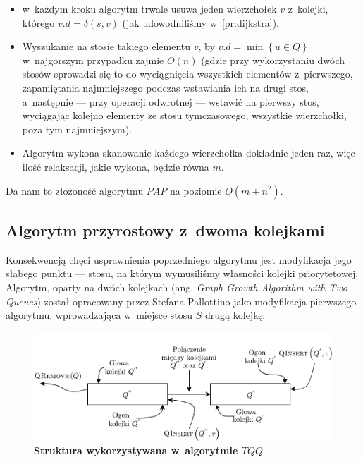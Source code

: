 \begin{itemize}
\item w~każdym kroku algorytm trwale usuwa jeden wierzchołek $v$ z~kolejki, którego $v.d = \delta \left( s, v \right)$ (jak udowodniliśmy w~\ref{pr:dijkstra}).
\item Wyszukanie na stosie takiego elementu $v$, by $v.d = \min \left\{ u \in Q \right\}$ w~najgorszym przypadku zajmie $ O \left( n \right) $ (gdzie przy wykorzystaniu dwóch stosów sprowadzi się to do wyciągnięcia wszystkich elementów z~pierwszego, zapamiętania najmniejszego podczas wstawiania ich na drugi stos, a~następnie --- przy operacji odwrotnej --- wstawić na pierwszy stos, wyciągając kolejno elementy ze stosu tymczasowego, wszystkie wierzchołki, poza tym najmniejszym).
\item Algorytm wykona skanowanie każdego wierzchołka dokładnie jeden raz, więc ilość relaksacji, jakie wykona, będzie równa $m$.
\end{itemize}

Da nam to złożoność algorytmu $PAP$ na poziomie $ O \left( m + n^{2} \right)$.

\subsection{Algorytm przyrostowy z~dwoma kolejkami}

Konsekwencją chęci usprawnienia poprzedniego algorytmu jest modyfikacja jego słabego punktu --- stosu, na którym wymusiliśmy własności kolejki priorytetowej. Algorytm, oparty na dwóch kolejkach (ang. \textit{Graph Growth Algorithm with Two Queues}) został opracowany przez Stefana Pallottino jako modyfikacja pierwszego algorytmu, wprowadzająca w~miejsce stosu $S$ drugą kolejkę:

\begin{figure}[!htbp]
	\centering
	\includegraphics[width=\textwidth]{Chapter_III/GRAPH-GROWTH-2Q-Other/a.pdf}
	\caption{\textbf{Struktura wykorzystywana w~algorytmie $TQQ$} } \label{fig:exampleTQQStructure}
\end{figure}


